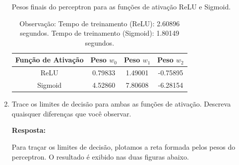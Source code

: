 \documentclass[12 pt]{article}
\begin{document}
\begin{enumerate}
    \begin{table}[H]
        \centering
        \caption{Pesos finais do perceptron para as funções de ativação ReLU e Sigmoid.}
        \begin{tabular}{|c|c|c|c|}
            \hline
            \textbf{Função de Ativação} & \textbf{Peso} $w_0$ & \textbf{Peso} $w_1$ & \textbf{Peso} $w_2$ \\ \hline
            ReLU                        & 0.79833             & 1.49001             & -0.75895            \\ \hline
            Sigmoid                     & 4.52860             & 7.80608             & -6.28154            \\ \hline
        \end{tabular}
        \vspace{0.3cm}
        \caption*{Observação: Tempo de treinamento (ReLU): 2.60896 segundos. Tempo de treinamento (Sigmoid): 1.80149 segundos.}
        \label{tab:pesos_finais}
    \end{table}
    
    \item Trace os limites de decisão para ambas as funções de ativação. Descreva quaisquer diferenças que você observar.\par

    \textbf{Resposta:} \par

    Para traçar os limites de decisão, plotamos a reta formada pelos pesos do perceptron. O resultado é exibido nas duas figuras abaixo.


\end{enumerate}
\end{document}

